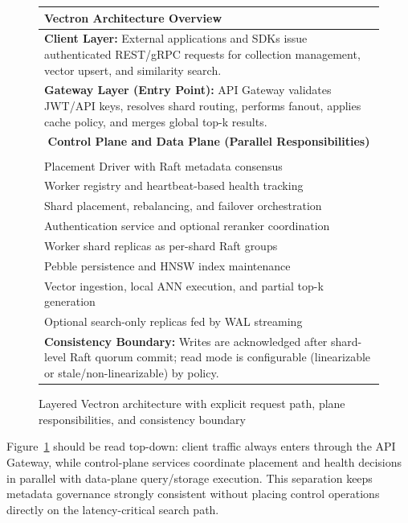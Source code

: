 \documentclass[conference]{IEEEtran}
\begin{document}
\begin{figure}[t]
\centering
\footnotesize
\setlength{\tabcolsep}{6pt}
\renewcommand{\arraystretch}{1.20}
\begin{tabular}{|p{}|}
\hline
\centering\textbf{Vectron Architecture Overview} \tabularnewline
\hline
\textbf{Client Layer:} External applications and SDKs issue authenticated REST/gRPC requests for collection management, vector upsert, and similarity search. \tabularnewline
\hline
\textbf{Gateway Layer (Entry Point):} API Gateway validates JWT/API keys, resolves shard routing, performs fanout, applies cache policy, and merges global top-k results. \tabularnewline
\hline
\multicolumn{1}{|c|}{\textbf{Control Plane and Data Plane (Parallel Responsibilities)}} \tabularnewline
\hline
\begin{minipage}[t]{0.47\textwidth}
\textbf{Control Plane}\\
Placement Driver with Raft metadata consensus\\
Worker registry and heartbeat-based health tracking\\
Shard placement, rebalancing, and failover orchestration\\
Authentication service and optional reranker coordination
\end{minipage}
\hfill
\begin{minipage}[t]{0.47\textwidth}
\textbf{Data Plane}\\
Worker shard replicas as per-shard Raft groups\\
Pebble persistence and HNSW index maintenance\\
Vector ingestion, local ANN execution, and partial top-k generation\\
Optional search-only replicas fed by WAL streaming
\end{minipage}
\tabularnewline
\hline
\textbf{Consistency Boundary:} Writes are acknowledged after shard-level Raft quorum commit; read mode is configurable (linearizable or stale/non-linearizable) by policy. \tabularnewline
\hline
\end{tabular}
\caption{Layered Vectron architecture with explicit request path, plane responsibilities, and consistency boundary}
\label{fig:architecture}
\end{figure}

Figure~\ref{fig:architecture} should be read top-down: client traffic always enters through the API Gateway, while control-plane services coordinate placement and health decisions in parallel with data-plane query/storage execution. This separation keeps metadata governance strongly consistent without placing control operations directly on the latency-critical search path.
\end{document}
